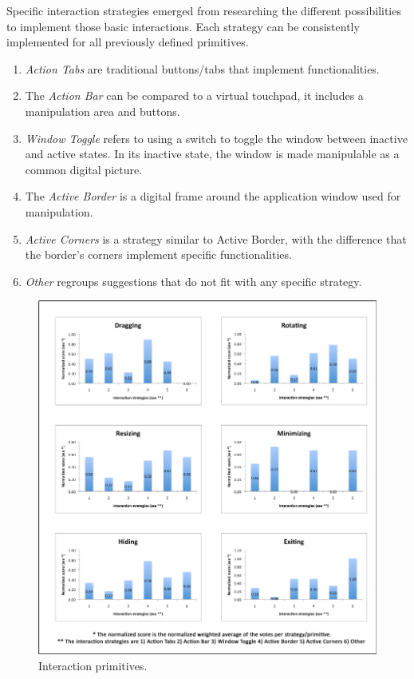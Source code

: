 Specific interaction strategies emerged from researching the different possibilities to implement those basic interactions.
Each strategy can be consistently implemented for all previously defined primitives.
\begin{enumerate}
\item{\emph{Action Tabs} are traditional buttons/tabs that implement functionalities.}
\item{The \emph{Action Bar} can be compared to a virtual touchpad, it includes a manipulation area and buttons.}
\item{\emph{Window Toggle} refers to using a switch to toggle the window between inactive and active states. In its inactive state, the window is made manipulable as a common digital picture.}
\item{The \emph{Active Border} is a digital frame around the application window used for manipulation.}
\item{\emph{Active Corners} is a strategy similar to Active Border, with the difference that the border's corners implement specific functionalities.}
\item{\emph{Other} regroups suggestions that do not fit with any specific strategy.}
\end{enumerate}


\begin{figure}[]
  \caption{Interaction primitives.}
  \centering
    \includegraphics[]{images/primHistog}
\end{figure}


